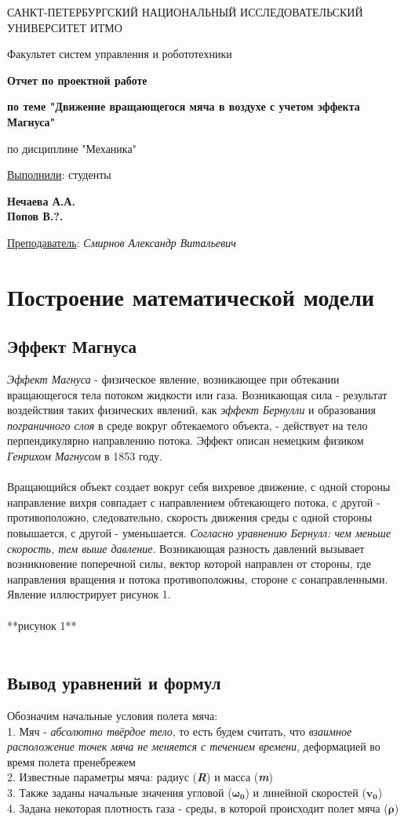 \documentclass[a5paper, 10pt]{article}
\theoremstyle{definition}
\theoremstyle{plain}
\theoremstyle{remark}
\newcommand*{\titlePage}{
	\thispagestyle{title}
	\begingroup
	\begin{center}
		\vspace*{6ex}
		
		{\small
			САНКТ-ПЕТЕРБУРГСКИЙ НАЦИОНАЛЬНЫЙ ИССЛЕДОВАТЕЛЬСКИЙ УНИВЕРСИТЕТ ИТМО	
		}
		
		\vspace*{2ex}
		
		{\normalsize
			Факультет систем управления и робототехники
		}
		
		\vspace*{15ex}
		
		{\Large \bfseries 
			Отчет по проектной работе
		}
\vspace*{2ex}
		
		{\Large \bfseries 
			по теме "Движение вращающегося мяча в воздухе с учетом эффекта Магнуса"
		}
\vspace*{2ex}
		
		{\Large
			по дисциплине "Механика"
		}

	\end{center}
	\vspace*{20ex}
	\begin{flushright}
		{\large 
			\underline{Выполнили}: студенты\\
			\begin{flushright}
				\textbf{Нечаева А.А.}\\
                                \textbf{Попов В.?.}\\
			\end{flushright}
		}
		
		\vspace*{5ex}
		
		{\large 
			\underline{Преподаватель}: \textit{Смирнов Александр Витальевич}
		}
	\end{flushright}	
	\newpage
	\setcounter{page}{2}
	\endgroup}
\begin{document}
	\titlePage
	\pagestyle{style}
\newpage
\section{Построение математической модели}
\subsection{Эффект Магнуса}
\textit{Эффект Магнуса} - физическое явление, возникающее при обтекании вращающегося тела потоком жидкости или газа. Возникающая сила - результат воздействия таких физических явлений, как \textit{эффект Бернулли} и образования \textit{пограничного слоя} в среде вокруг обтекаемого объекта, - действует на тело перпендикулярно направлению потока. Эффект описан немецким физиком \textit{Генрихом Магнусом} в 1853 году. \\\\
Вращающийся объект создает вокруг себя вихревое движение, с одной стороны направление вихря совпадает с направлением обтекающего потока, с другой - противоположно, следовательно, скорость движения среды с одной стороны повышается, с другой - уменьшается. \textit{Согласно уравнению Бернулл: чем меньше скорость, тем выше давление}. Возникающая разность давлений вызывает возникновение поперечной силы, вектор которой направлен от стороны, где направления вращения и потока противоположны, стороне с сонаправленными. Явление иллюстрирует рисунок 1.
\\\\
**рисунок 1**
\\\\
\subsection{Вывод уравнений и формул}	
Обозначим начальные условия полета мяча:\\
1. Мяч - \textit{абсолютно твёрдое тело}, то есть будем считать, что \textit{взаимное расположение точек мяча не меняется с течением времени}, деформацией во время полета пренебрежем\\
2. Известные параметры мяча: радиус (\textit{\textbf{R}}) и масса (\textit{\textbf{m}})\\
3. Также заданы начальные значения угловой ($\mathbf{\omega_{0}}$) и линейной скоростей ($\mathbf{v_{0}}$)\\
4. Задана некоторая плотность газа - среды, в которой происходит полет мяча ($\mathbf{\rho}$)\\\\
\end{document}
